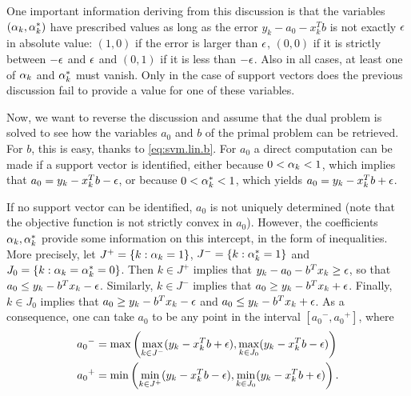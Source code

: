 One important information deriving from this discussion is that the variables $(\alpha_k, \alpha_k^*)$ have prescribed values as long as the error $y_k - {a_0} - x_k^T b$ is not exactly $\epsilon$ in absolute value: $(1,0)$ if the error is larger than $\epsilon$, $(0,0)$ if it is strictly between $-\epsilon$ and $\epsilon$ and $(0,1)$ if it is less than $-\epsilon$. Also in all cases, at least one of $\alpha_k$ and $\alpha_k^*$ must vanish. Only in the case of support vectors does the previous discussion fail to provide a value for one of these variables.

Now, we want to reverse the discussion and assume that the dual problem is solved to see how the variables ${a_0}$ and $b$ of the primal problem can be retrieved. For $b$, this is easy, thanks to \eqref{eq:svm.lin.b}. For ${a_0}$ a direct computation can be made if a support vector is identified, either because $0 < \alpha_k <1$, which implies that ${a_0} = y_k - x_k^Tb -\epsilon$, or because 
$0 < \alpha^*_k <1$, which yields ${a_0} = y_k - x_k^Tb +\epsilon$.

If no support vector can be identified, ${a_0}$ is not uniquely determined (note that the objective function is not strictly convex in ${a_0}$). However, the coefficients $\alpha_k, \alpha_k^*$ provide some information on this intercept, in the form of inequalities. More precisely, let
$J^+ =  \{k : \alpha_k = 1\}$, $J^- = \{k:\alpha_k^* = 1\}$ and $J_0 = \{k:\alpha_k = \alpha_k^* = 0\}$. Then $k \in J^+$ implies that 
$y_k - {a_0} - b^Tx_k \geq \epsilon$, so that ${a_0} \leq y_k - b^T x_k -\epsilon$. Similarly, $k\in J^-$ implies that ${a_0} \geq y_k - b^T x_k +\epsilon$. Finally, $k\in J_0$ implies that ${a_0} \geq y_k - b^T x_k -\epsilon$ and ${a_0} \leq y_k - b^T x_k +\epsilon$. As a consequence, one can take ${a_0}$ to be any point in the interval $[{a_0}^-, {a_0}^+]$, where
\begin{align*}
{a_0}^- &= \max\left(\max_{k\in J^-} (y_k - x_k^Tb + \epsilon), \max_{k\in J_0} (y_k - x_k^T b - \epsilon)\right)\\
{a_0}^+ &= \min\left(\min_{k\in J^+} (y_k - x_k^Tb - \epsilon), \min_{k\in J_0} (y_k - x_k^T b + \epsilon)\right).
\end{align*}
%
%
%
%


